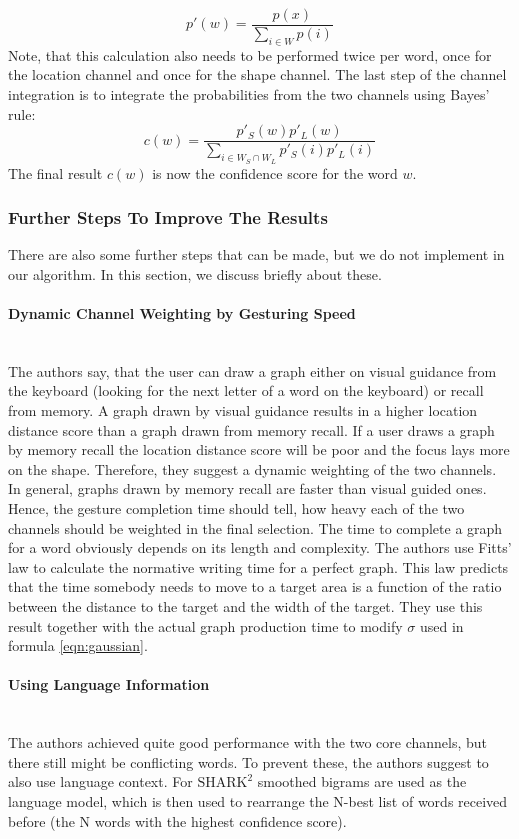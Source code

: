 \begin{equation}
    p'(w) = \frac{p(x)}{\sum\limits_{i \in W}p(i)}
\end{equation}
Note, that this calculation also needs to be performed twice per word, once for the location channel and once for the shape channel. The last step of the channel integration is to integrate the probabilities from the two channels using Bayes' rule:
\begin{equation}
    c(w) = \frac{p'_S(w)p'_L(w)}{\sum\limits_{i \in W_S \cap W_L}p'_S(i)p'_L(i)}
\end{equation}
The final result $c(w)$ is now the confidence score for the word $w$.

\subsubsection{Further Steps To Improve The Results}
There are also some further steps that can be made, but we do not implement in our algorithm. In this section, we discuss briefly about these.
\paragraph{Dynamic Channel Weighting by Gesturing Speed}\
\label{gesturing speed}\\
The authors say, that the user can draw a graph either on visual guidance from the keyboard (looking for the next letter of a word on the keyboard) or recall from memory. A graph drawn by visual guidance results in a higher location distance score than a graph drawn from memory recall. If a user draws a graph by memory recall the location distance score will be poor and the focus lays more on the shape. Therefore, they suggest a dynamic weighting of the two channels. In general, graphs drawn by memory recall are faster than visual guided ones. Hence, the gesture completion time should tell, how heavy each of the two channels should be weighted in the final selection. The time to complete a graph for a word obviously depends on its length and complexity. The authors use Fitts' law to calculate the normative writing time for a perfect graph. This law predicts that the time somebody needs to move to a target area is a function of the ratio between the distance to the target and the width of the target. They use this result together with the actual graph production time to modify $\sigma$ used in formula \ref{eqn:gaussian}.\\
\paragraph{Using Language Information}\ \\
The authors achieved quite good performance with the two core channels, but there still might be conflicting words. To prevent these, the authors suggest to also use language context. For $\text{SHARK}^2$ smoothed bigrams are used as the language model, which is then used to rearrange the N-best list of words received before (the N words with the highest confidence score).